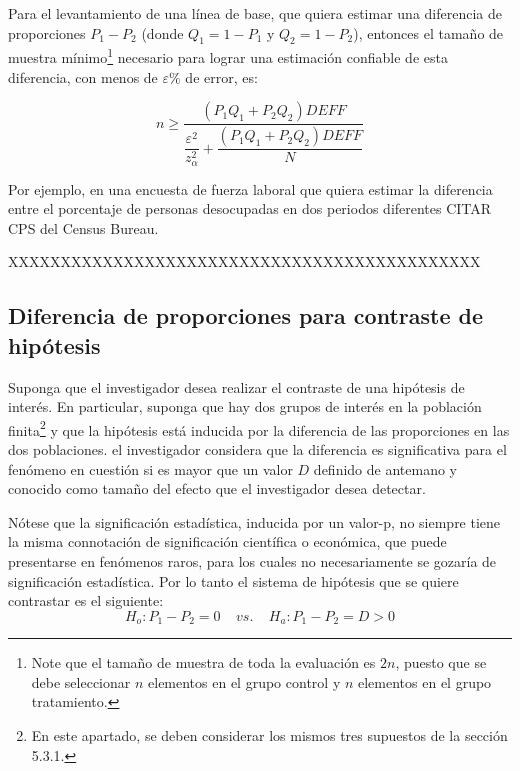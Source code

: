 \documentclass[
  12pt,
  spanish,
]{book}
\begin{document}
Para el levantamiento de una línea de base, que quiera estimar una diferencia de proporciones \(P_1-P_2\) (donde \(Q_1=1-P_1\) y \(Q_2=1-P_2\)), entonces el tamaño de muestra mínimo\footnote{Note que el tamaño de muestra de toda la evaluación es $2n$, puesto que se debe seleccionar $n$ elementos en el grupo control y $n$ elementos en el grupo tratamiento.} necesario para lograr una estimación confiable de esta diferencia, con menos de \(\varepsilon\%\) de error, es:

\begin{equation} 
n \geq \dfrac{(P_1Q_1+P_2Q_2)DEFF}{\dfrac{\varepsilon^2}{z_{\alpha}^2}+\dfrac{(P_1Q_1+P_2Q_2)DEFF}{N}}
\end{equation}

Por ejemplo, en una encuesta de fuerza laboral que quiera estimar la diferencia entre el porcentaje de personas desocupadas en dos periodos diferentes CITAR CPS del Census Bureau.

XXXXXXXXXXXXXXXXXXXXXXXXXXXXXXXXXXXXXXXXXXXXX

\hypertarget{diferencia-de-proporciones-para-contraste-de-hipuxf3tesis}{%
\subsection{Diferencia de proporciones para contraste de hipótesis}\label{diferencia-de-proporciones-para-contraste-de-hipuxf3tesis}}

Suponga que el investigador desea realizar el contraste de una hipótesis de interés. En particular, suponga que hay dos grupos de interés en la población finita\footnote{En este apartado, se deben considerar los mismos tres supuestos de la sección 5.3.1.} y que la hipótesis está inducida por la diferencia de las proporciones en las dos poblaciones. el investigador considera que la diferencia es significativa para el fenómeno en cuestión si es mayor que un valor \(D\) definido de antemano y conocido como tamaño del efecto que el investigador desea detectar.

Nótese que la significación estadística, inducida por un valor-p, no siempre tiene la misma connotación de significación científica o económica, que puede presentarse en fenómenos raros, para los cuales no necesariamente se gozaría de significación estadística. Por lo tanto el sistema de hipótesis que se quiere contrastar es el siguiente:
\begin{equation*}
H_o: P_1-P_2=0 \ \ \ \ \ vs.  \ \ \ \ \ H_a: P_1 -P_2 =D > 0 
\end{equation*}
\end{document}

